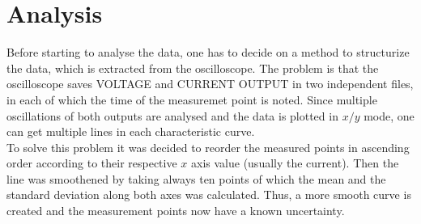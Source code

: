 \documentclass[a4paper,10pt]{article}
\begin{document}
\section{Analysis}
Before starting to analyse the data, one has to decide on a method to structurize the data, which is extracted from the oscilloscope. The problem is that the oscilloscope saves VOLTAGE and CURRENT OUTPUT in two independent files, in each of which the time of the measuremet point is noted. Since multiple oscillations of both outputs are analysed and the data is plotted in $x/y$ mode, one can get multiple lines in each characteristic curve. 
\\
To solve this problem it was decided to reorder the measured points in ascending order according to their respective $x$ axis value (usually the current). Then the line was smoothened by taking always ten points of which the mean and the standard deviation along both axes was calculated. Thus, a more smooth curve is created and the measurement points now have a known uncertainty.
\end{document}
